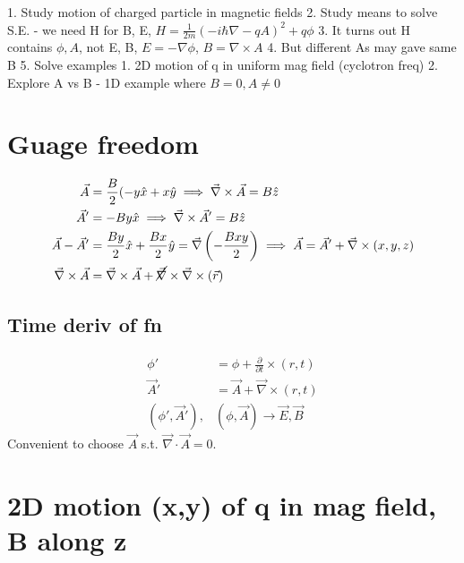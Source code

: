 \documentclass[a4paper, 11pt, normalem]{report}
\begin{document}
1. Study motion of charged particle in magnetic fields
2. Study means to solve S.E. - we need H for B, E, $H = \frac{1}{2m}\left(-i\hbar\nabla - qA\right)^2 + q\phi$
3. It turns out H contains $\phi, A$, not E, B, $E = -\nabla\phi$, $B = \nabla\times A$
4. But different As may gave same B
5. Solve examples
    1. 2D motion of q in uniform mag field (cyclotron freq)
    2. Explore A vs B - 1D example where $B = 0, A \neq 0$

\section{Guage freedom}
\begin{align}
    \vec{A} &= \frac{B}{2}(-y\hat{x} + x\hat{y} \implies \vec{\nabla} \times\vec{A} = B\hat{z} \\
    \vec{A}' &= -By\hat{x} \implies \vec{\nabla}\times\vec{A}' = B\hat{z} \\
    \vec{A} - \vec{A}' &= \frac{By}{2}\hat{x} + \frac{Bx}{2}\hat{y} = \vec{\nabla}\left(-\frac{Bxy}{2}\right) \implies \vec{A} = \vec{A}' + \vec{\nabla}\times(x,y,z) \\
    \vec{\nabla} \times \vec{A} &= \vec{\nabla} \times \vec{A} + \cancel{\vec{\nabla}} \times \vec{\nabla}\times(\vec{r})
\end{align}

\subsection{Time deriv of fn}
\begin{align}
    \phi' &= \phi + \frac{\partial}{\partial t}\times(r,t) \\
    \vec{A}' &= \vec{A} + \vec{\nabla}\times(r,t) \\
    (\phi',\vec{A}'),& (\phi,\vec{A}) \to \vec{E},\vec{B}
\end{align}
Convenient to choose $\vec{A}$ s.t. $\vec{\nabla}\cdot\vec{A} = 0$.

\section{2D motion (x,y) of q in mag field, B along z}
\end{document}
